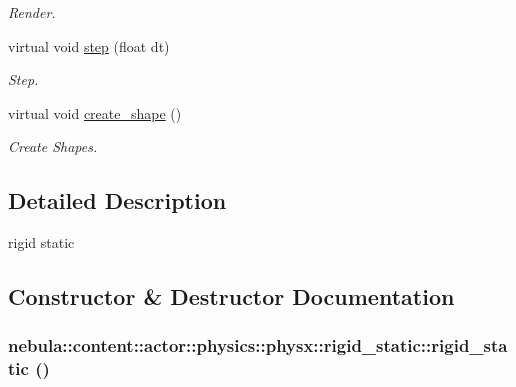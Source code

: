 \begin{DoxyCompactItemize}
\begin{DoxyCompactList}\small\item\em Render. \item\end{DoxyCompactList}\item 
virtual void \hyperlink{classnebula_1_1content_1_1actor_1_1physics_1_1physx_1_1rigid__static_a06213f6134a1f1efbbfead280cd185e7}{step} (float dt)
\begin{DoxyCompactList}\small\item\em Step. \item\end{DoxyCompactList}\item 
virtual void \hyperlink{classnebula_1_1content_1_1actor_1_1physics_1_1physx_1_1rigid__static_aa98f8ef1b2ba6b59b36e4e6506aee2d9}{create\_\-shape} ()
\begin{DoxyCompactList}\small\item\em Create Shapes. \item\end{DoxyCompactList}\end{DoxyCompactItemize}


\subsection{Detailed Description}
rigid static 

\subsection{Constructor \& Destructor Documentation}
\hypertarget{classnebula_1_1content_1_1actor_1_1physics_1_1physx_1_1rigid__static_aab760c99217235c1a859436a9639a3ba}{
\subsubsection[{rigid\_\-static}]{\setlength{\rightskip}{0pt plus 5cm}nebula::content::actor::physics::physx::rigid\_\-static::rigid\_\-static ()}}
\label{classnebula_1_1content_1_1actor_1_1physics_1_1physx_1_1rigid__static_aab760c99217235c1a859436a9639a3ba}



